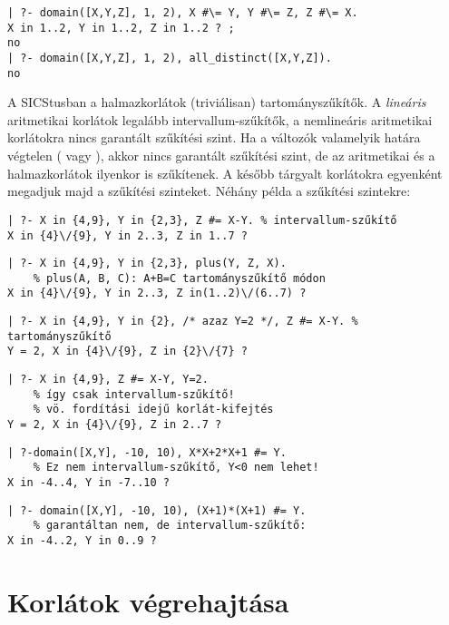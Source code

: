 \begin{verbatim}
| ?- domain([X,Y,Z], 1, 2), X #\= Y, Y #\= Z, Z #\= X.
X in 1..2, Y in 1..2, Z in 1..2 ? ;
no
| ?- domain([X,Y,Z], 1, 2), all_distinct([X,Y,Z]).
no
\end{verbatim}

A SICStusban a halmazkorlátok (triviálisan) tartományszűkítők. A
\emph{lineáris} aritmetikai korlátok legalább intervallum-szűkítők,
a nemlineáris aritmetikai korlátokra nincs garantált szűkítési szint.
Ha a változók valamelyik határa végtelen ( vagy ), akkor
nincs garantált szűkítési szint, de az aritmetikai és a halmazkorlátok
ilyenkor is szűkítenek. A később tárgyalt korlátokra egyenként megadjuk majd
a szűkítési szinteket.
\br
Néhány példa a szűkítési szintekre:
\begin{verbatim}
| ?- X in {4,9}, Y in {2,3}, Z #= X-Y. % intervallum-szűkítő
X in {4}\/{9}, Y in 2..3, Z in 1..7 ?
\end{verbatim}
\begin{verbatim}
| ?- X in {4,9}, Y in {2,3}, plus(Y, Z, X).
    % plus(A, B, C): A+B=C tartományszűkítő módon
X in {4}\/{9}, Y in 2..3, Z in(1..2)\/(6..7) ?
\end{verbatim}
\begin{verbatim}
| ?- X in {4,9}, Y in {2}, /* azaz Y=2 */, Z #= X-Y. % tartományszűkítő
Y = 2, X in {4}\/{9}, Z in {2}\/{7} ?
\end{verbatim}
\begin{verbatim}
| ?- X in {4,9}, Z #= X-Y, Y=2.
    % így csak intervallum-szűkítő!
    % vö. fordítási idejű korlát-kifejtés
Y = 2, X in {4}\/{9}, Z in 2..7 ?
\end{verbatim}
\begin{verbatim}
| ?-domain([X,Y], -10, 10), X*X+2*X+1 #= Y.
    % Ez nem intervallum-szűkítő, Y<0 nem lehet!
X in -4..4, Y in -7..10 ?
\end{verbatim}
\begin{verbatim}
| ?- domain([X,Y], -10, 10), (X+1)*(X+1) #= Y.
    % garantáltan nem, de intervallum-szűkítő:
X in -4..2, Y in 0..9 ?
\end{verbatim}



\section{Korlátok végrehajtása}

\label{korlatvegrehajtas}

